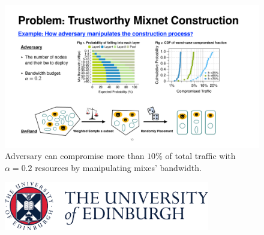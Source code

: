 \documentclass[final]{beamer}
\newlength{\leftcolwidth}
\newlength{\rightcolwidth}
\begin{document}
\begin{frame}[t]
\begin{columns}[t]
\begin{column}{\leftcolwidth}
\begin{block}{}
  \begin{figure}
    \includegraphics[width=\rightcolwidth]{images/problem_eg.pdf}
    \caption{Adversary can compromise more than $10\%$ of total traffic with $\alpha=0.2$ resources by manipulating mixes' bandwidth.}
  \end{figure}
\end{block}


  \begin{minipage}[t]{0.32\rightcolwidth}
   \begin{figure}
   \centering
    \includegraphics[width=0.8\textwidth]{images/UoE-logo.png}
  \end{figure}
  \end{minipage}
  \hfil
  \begin{minipage}[t]{0.32\rightcolwidth}


\end{minipage}
\end{column}
\end{columns}
\end{frame}
\end{document}
